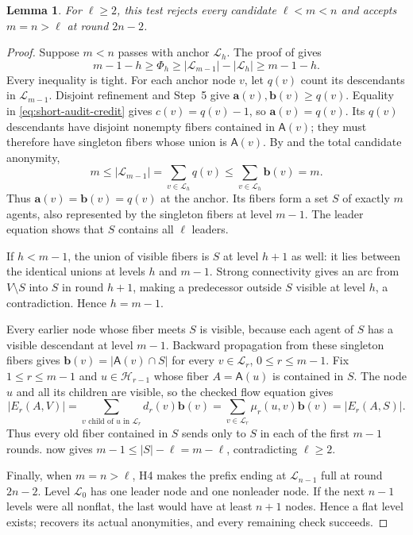 \documentclass[11pt]{article}
\newcommand{\anon}{\mathbf a}
\newcommand{\cand}{\mathbf b}
\newcommand{\agents}{\mathsf A}
\newtheorem{lemma}{Lemma}
\begin{document}
\begin{lemma}
\label{lem:multi-leader-test}
For \(\ell\geq2\), this test rejects every candidate
\(\ell<m<n\) and accepts \(m=n>\ell\) at round \(2n-2\).
\end{lemma}

\begin{proof}
Suppose \(m<n\) passes with anchor \(\mathcal L_h\).
The proof of  gives
\begin{equation}
 m-1-h\geq\Phi_h
 \geq|\mathcal L_{m-1}|-|\mathcal L_h|
 \geq m-1-h.
 \label{eq:short-audit-credit}
\end{equation}
Every inequality is tight. For each anchor node \(v\), let \(q(v)\)
count its descendants in \(\mathcal L_{m-1}\).
Disjoint refinement and Step~5 give
\(\anon(v),\cand(v)\geq q(v)\). Equality in
\eqref{eq:short-audit-credit} gives \(c(v)=q(v)-1\), so
\(\anon(v)=q(v)\). Its \(q(v)\) descendants have disjoint nonempty
fibers contained in \(\agents(v)\); they must therefore have
singleton fibers whose union is \(\agents(v)\).
By  and the total candidate anonymity,
\[
 m\leq|\mathcal L_{m-1}|=\sum_{v\in\mathcal L_h}q(v)
 \leq\sum_{v\in\mathcal L_h}\cand(v)=m.
\]
Thus \(\anon(v)=\cand(v)=q(v)\) at the anchor. Its fibers form
a set \(S\) of exactly \(m\) agents, also represented by the
singleton fibers at level \(m-1\). The leader equation shows
that \(S\) contains all \(\ell\) leaders.

If \(h<m-1\), the union of visible fibers is \(S\) at level
\(h+1\) as well: it lies between the identical unions at levels
\(h\) and \(m-1\). Strong connectivity gives an arc from
\(V\setminus S\) into \(S\) in round \(h+1\), making a predecessor
outside \(S\) visible at level \(h\), a contradiction.
Hence \(h=m-1\).

Every earlier node whose fiber meets \(S\) is visible, because
each agent of \(S\) has a visible descendant at level \(m-1\).
Backward propagation from these singleton fibers gives
\(\cand(v)=|\agents(v)\cap S|\) for every
\(v\in\mathcal L_r\), \(0\leq r\leq m-1\).
Fix \(1\leq r\leq m-1\) and \(u\in\mathcal H_{r-1}\) whose
fiber \(A=\agents(u)\) is contained in \(S\).
The node \(u\) and all its children are visible, so the checked
flow equation gives
\[
 |E_r(A,V)|
 =\sum_{v\text{ child of }u\text{ in }\mathcal L_r}
      d_r(v)\cand(v)
 =\sum_{v\in\mathcal L_r}\mu_r(u,v)\cand(v)
 =|E_r(A,S)|.
\]
Thus every old fiber contained in \(S\) sends only to \(S\)
in each of the first \(m-1\) rounds.
 now gives
\(m-1\leq |S|-\ell=m-\ell\), contradicting \(\ell\geq2\).

Finally, when \(m=n>\ell\), H4 makes the prefix ending at
\(\mathcal L_{n-1}\) full at round \(2n-2\).
Level \(\mathcal L_0\) has one leader node and one nonleader node.
If the next \(n-1\) levels were all nonflat, the last would have
at least \(n+1\) nodes. Hence a flat level exists;
 recovers its actual anonymities,
and every remaining check succeeds.
\end{proof}
\end{document}
